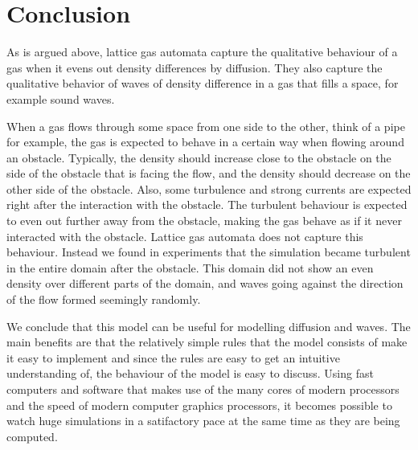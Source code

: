 \documentclass[12pt,a4paper]{article}
\begin{document}
\section{Conclusion}
\label{sec:conclusion}
As is argued above, lattice gas automata capture the qualitative behaviour of a gas when it evens out density differences by diffusion. They also capture the qualitative behavior of waves of density difference in a gas that fills a space, for example sound waves.

When a gas flows through some space from one side to the other, think of a pipe for example, the gas is expected to behave in a certain way when flowing around an obstacle. Typically, the density should increase close to the obstacle on the side of the obstacle that is facing the flow, and the density should decrease on the other side of the obstacle. Also, some turbulence and strong currents are expected right after the interaction with the obstacle. The turbulent behaviour is expected to even out further away from the obstacle, making the gas behave as if it never interacted with the obstacle. Lattice gas automata does not capture this behaviour. Instead we found in experiments that the simulation became turbulent in the entire domain after the obstacle. This domain did not show an even density over different parts of the domain, and waves going against the direction of the flow formed seemingly randomly.

We conclude that this model can be useful for modelling diffusion and waves. The main benefits are that the relatively simple rules that the model consists of make it easy to implement and since the rules are easy to get an intuitive understanding of, the behaviour of the model is easy to discuss. Using fast computers and software that makes use of the many cores of modern processors and the speed of modern computer graphics processors, it becomes possible to watch huge simulations in a satifactory pace at the same time as they are being computed.
\end{document}
